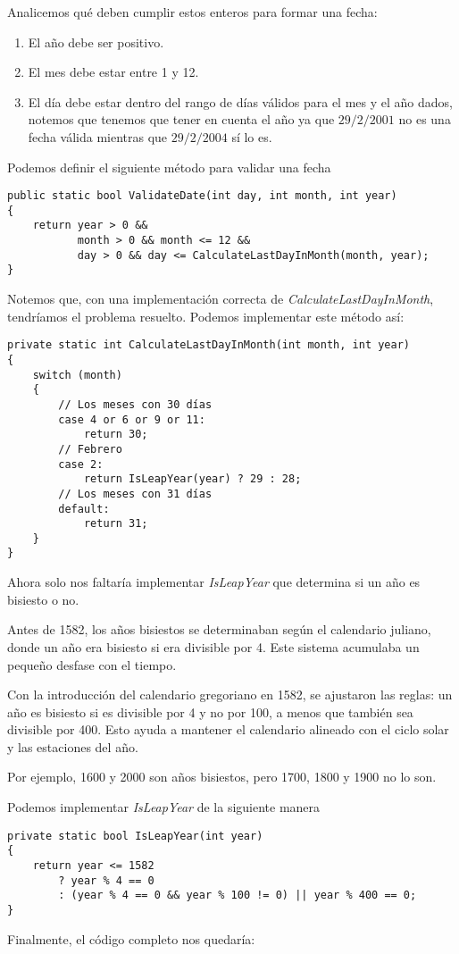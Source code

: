 Analicemos qué deben cumplir estos enteros para formar una fecha:
\begin{enumerate}
    \item El año debe ser positivo.
    \item El mes debe estar entre 1 y 12.
    \item El día debe estar dentro del rango de días válidos para el mes y el año dados, notemos que tenemos que tener en cuenta el año ya que $29/2/2001$ no es una fecha válida mientras que $29/2/2004$ sí lo es.
\end{enumerate}

Podemos definir el siguiente método para validar una fecha
\begin{lstlisting}
public static bool ValidateDate(int day, int month, int year)
{
    return year > 0 &&
           month > 0 && month <= 12 &&
           day > 0 && day <= CalculateLastDayInMonth(month, year);
}
\end{lstlisting}

Notemos que, con una implementación correcta de \textit{CalculateLastDayInMonth}, tendríamos el problema resuelto. Podemos implementar este método así:
\begin{lstlisting}
private static int CalculateLastDayInMonth(int month, int year)
{
    switch (month)
    {
        // Los meses con 30 días
        case 4 or 6 or 9 or 11:
            return 30;
        // Febrero
        case 2:
            return IsLeapYear(year) ? 29 : 28;
        // Los meses con 31 días
        default:
            return 31;
    }
}
\end{lstlisting}

Ahora solo nos faltaría implementar \textit{IsLeapYear} que determina si un año es bisiesto o no.

\begin{tcolorbox}
    Antes de 1582, los años bisiestos se determinaban según el calendario juliano, donde un año era bisiesto si era divisible por 4. Este sistema acumulaba un pequeño desfase con el tiempo.

    Con la introducción del calendario gregoriano en 1582, se ajustaron las reglas: un año es bisiesto si es divisible por 4 y no por 100, a menos que también sea divisible por 400. Esto ayuda a mantener el calendario alineado con el ciclo solar y las estaciones del año.

    Por ejemplo, 1600 y 2000 son años bisiestos, pero 1700, 1800 y 1900 no lo son.
\end{tcolorbox}

Podemos implementar \textit{IsLeapYear} de la siguiente manera

\begin{lstlisting}
private static bool IsLeapYear(int year)
{
    return year <= 1582
        ? year % 4 == 0
        : (year % 4 == 0 && year % 100 != 0) || year % 400 == 0;
}
\end{lstlisting}

Finalmente, el código completo nos quedaría:

